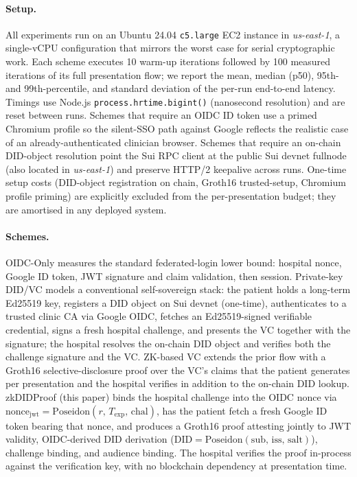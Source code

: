 \paragraph{Setup.}
All experiments run on an Ubuntu 24.04 \texttt{c5.large} EC2 instance in
\textit{us-east-1}, a single-vCPU configuration that mirrors the worst case
for serial cryptographic work. Each scheme executes 10 warm-up iterations
followed by 100 measured iterations of its full presentation flow; we report
the mean, median (p50), 95th- and 99th-percentile, and standard deviation of
the per-run end-to-end latency. Timings use Node.js
\texttt{process.hrtime.bigint()} (nanosecond resolution) and are reset between
runs. Schemes that require an OIDC ID token use a primed Chromium profile so
the silent-SSO path against Google reflects the realistic case of an
already-authenticated clinician browser. Schemes that require an on-chain
DID-object resolution point the Sui RPC client at the public Sui devnet
fullnode (also located in \textit{us-east-1}) and preserve HTTP/2 keepalive
across runs. One-time setup costs (DID-object registration on chain,
Groth16 trusted-setup, Chromium profile priming) are explicitly excluded
from the per-presentation budget; they are amortised in any deployed system.

\paragraph{Schemes.}
\textsf{OIDC-Only} measures the standard federated-login lower bound:
hospital nonce, Google ID token, JWT signature and claim validation, then
session. \textsf{Private-key DID/VC} models a conventional self-sovereign
stack: the patient holds a long-term Ed25519 key, registers a DID object on
Sui devnet (one-time), authenticates to a trusted clinic CA via Google
OIDC, fetches an Ed25519-signed verifiable credential, signs a fresh
hospital challenge, and presents the VC together with the signature; the
hospital resolves the on-chain DID object and verifies both the challenge
signature and the VC. \textsf{ZK-based VC} extends the prior flow with a
Groth16 selective-disclosure proof over the VC's claims that the patient
generates per presentation and the hospital verifies in addition to the
on-chain DID lookup. \textsf{zkDIDProof} (this paper) binds the hospital
challenge into the OIDC nonce via $\mathrm{nonce}_{\mathrm{jwt}} =
\mathrm{Poseidon}(r,\,T_{\mathrm{exp}},\,\mathrm{chal})$, has the patient
fetch a fresh Google ID token bearing that nonce, and produces a Groth16
proof attesting jointly to JWT validity, OIDC-derived DID derivation
($\mathrm{DID} = \mathrm{Poseidon}(\mathrm{sub},\,\mathrm{iss},\,
\mathrm{salt})$), challenge binding, and audience binding. The hospital
verifies the proof in-process against the verification key, with no
blockchain dependency at presentation time.

